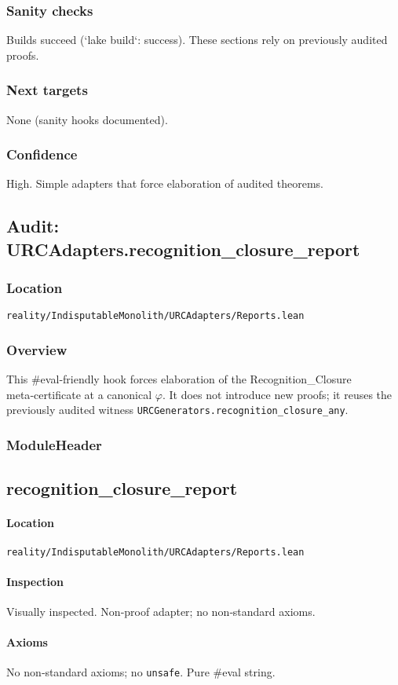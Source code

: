 \documentclass{article}
\newcommand{\FileRef}[1]{\texttt{#1}}
\newcommand{\ModuleHeader}[3]{%
  \subsection{#1}
  \paragraph{Location} \FileRef{#2}\\
  \paragraph{Inspection} #3
}
\begin{document}
\subsubsection{Sanity checks}
Builds succeed (`lake build`: success). These sections rely on previously audited proofs.

\subsubsection{Next targets}
None (sanity hooks documented).

\subsubsection{Confidence}
High. Simple adapters that force elaboration of audited theorems.

\subsection{Audit: URCAdapters.recognition\_closure\_report}
\subsubsection{Location}
\FileRef{reality/IndisputableMonolith/URCAdapters/Reports.lean}

\subsubsection{Overview}
This #eval‑friendly hook forces elaboration of the Recognition\_Closure meta‑certificate at a canonical \(\varphi\). It does not introduce new proofs; it reuses the previously audited witness \texttt{URCGenerators.recognition\_closure\_any}.

\subsubsection{ModuleHeader}
\ModuleHeader{recognition\_closure\_report}{reality/IndisputableMonolith/URCAdapters/Reports.lean}{Visually inspected. Non‑proof adapter; no non‑standard axioms.}

\paragraph{Axioms}
No non‑standard axioms; no \texttt{unsafe}. Pure #eval string.
\end{document}
